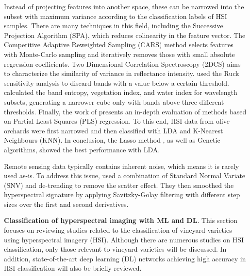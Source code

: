 Instead of projecting features into another space, these can be narrowed into the subset with maximum variance according to the classification labels of HSI samples. There are many techniques in this field, including the Successive Projection Algorithm (SPA), which reduces colinearity in the feature vector. The Competitive Adaptive Reweighted Sampling (CARS) method selects features with Monte-Carlo sampling and iteratively removes those with small absolute regression coefficients. Two-Dimensional Correlation Spectroscopy (2DCS) aims to characterize the similarity of variance in reflectance intensity. \cite{liu_dimension_2019} used the Ruck sensitivity analysis to discard bands with a value below a certain threshold. \cite{agilandeeswari_crop_2022} calculated the band entropy, vegetation index, and water index for wavelength subsets, generating a narrower cube only with bands above three different thresholds. Finally, the work of \cite{santos-rufo_wavelength_2020} presents an in-depth evaluation of methods based on Partial Least Squares (PLS) regression. To this end, HSI data from olive orchards were first narrowed and then classified with LDA and K-Nearest Neighbours (KNN). In conclusion, the Lasso method \cite{friedman_regularization_2010}, as well as Genetic algorithms, \cite{mehmood_review_2012} showed the best performance with LDA. 

Remote sensing data typically contains inherent noise, which means it is rarely used as-is. To address this issue, \cite{gutierrez_--go_2018} used a combination of Standard Normal Variate (SNV) and de-trending to remove the scatter effect. They then smoothed the hyperspectral signature by applying Savitzky-Golay filtering with different step sizes over the first and second derivatives.

\textbf{Classification of hyperspectral imaging with ML and DL}. This section focuses on reviewing studies related to the classification of vineyard varieties using hyperspectral imagery (HSI). Although there are numerous studies on HSI classification, only those relevant to vineyard varieties will be discussed. In addition, state-of-the-art deep learning (DL) networks achieving high accuracy in HSI classification will also be briefly reviewed.


